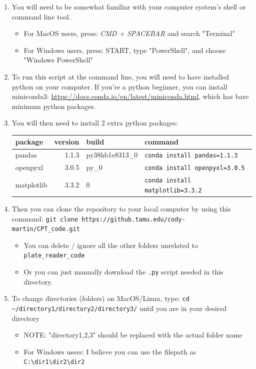 \documentclass[12pt]{article}
\begin{document}
\begin{enumerate}
\item You will need to be somewhat familiar with your computer system's shell or command line tool.
\begin{itemize}
\item For MacOS users, press: \emph{CMD + SPACEBAR} and search "Terminal"
\item For Windows users, press: START, type "PowerShell", and choose
"Windows PowerShell"
\end{itemize}

\item To run this script at the command line, you will need to have installed python on your computer. If you're a python beginner, you can install miniconda3: \url{https://docs.conda.io/en/latest/miniconda.html}, which has bare minimum python packages.

\item You will then need to install 2 extra python packages:
\begin{center}
\begin{tabular}{lrll}
package & version & build & command\\
\hline
pandas & 1.1.3 & py38hb1e8313\_0 & \texttt{conda install pandas=1.1.3}\\
openpyxl & 3.0.5 & py\_0 & \texttt{conda install openpyxl=3.0.5}\\
matplotlib & 3.3.2 & 0 & \texttt{conda install matplotlib=3.3.2}\\
\end{tabular}
\end{center}

\item Then you can clone the repository to your local computer by using this command: \texttt{git clone https://github.tamu.edu/cody-martin/CPT\_code.git}
\begin{itemize}
\item You can delete / ignore all the other folders unrelated to \texttt{plate\_reader\_code}
\item Or you can just manually download the \texttt{.py} script needed in this directory.
\end{itemize}

\item To change directories (folders) on MacOS/Linux, type: \texttt{cd \textasciitilde{}/directory1/directory2/directory3/} until you are in your desired directory
\begin{itemize}
\item NOTE: "directory1,2,3" should be replaced with the actual folder name
\item For Windows users: I believe you can use the filepath as \texttt{C:\textbackslash{}dir1\textbackslash{}dir2\textbackslash{}dir2}
\end{itemize}


\end{enumerate}
\end{document}
